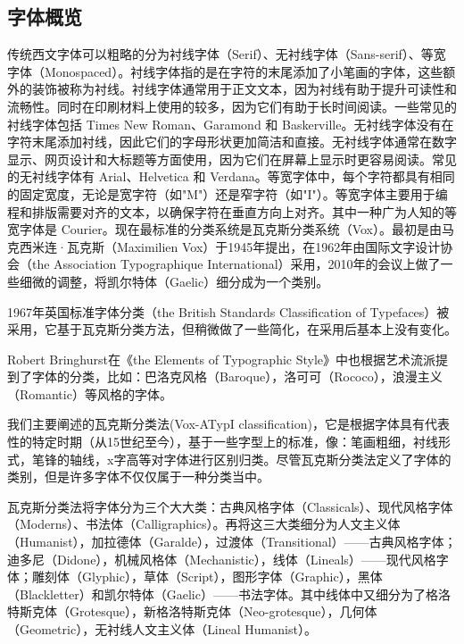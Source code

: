 \documentclass[../../../dolphin-book-2023.tex]{subfiles}
\begin{document}
\subsection{字体概览}

传统西文字体可以粗略的分为衬线字体（Serif）、无衬线字体（Sans-serif）、等宽字体（Monospaced）。衬线字体指的是在字符的末尾添加了小笔画的字体，这些额外的装饰被称为衬线。衬线字体通常用于正文文本，因为衬线有助于提升可读性和流畅性。同时在印刷材料上使用的较多，因为它们有助于长时间阅读。一些常见的衬线字体包括 Times New Roman、Garamond 和 Baskerville。无衬线字体没有在字符末尾添加衬线，因此它们的字母形状更加简洁和直接。无衬线字体通常在数字显示、网页设计和大标题等方面使用，因为它们在屏幕上显示时更容易阅读。常见的无衬线字体有 Arial、Helvetica 和 Verdana。等宽字体中，每个字符都具有相同的固定宽度，无论是宽字符（如"M"）还是窄字符（如"I"）。等宽字体主要用于编程和排版需要对齐的文本，以确保字符在垂直方向上对齐。其中一种广为人知的等宽字体是 Courier。现在最标准的分类系统是瓦克斯分类系统（Vox）。最初是由马克西米连·瓦克斯（Maximilien Vox）于1945年提出，在1962年由国际文字设计协会（the Association Typographique International）采用，2010年的会议上做了一些细微的调整，将凯尔特体（Gaelic）细分成为一个类别。

1967年英国标准字体分类（the British Standards Classification of Typefaces）被采用，它基于瓦克斯分类方法，但稍微做了一些简化，在采用后基本上没有变化。

Robert Bringhurst在《the Elements of Typographic Style》中也根据艺术流派提到了字体的分类，比如：巴洛克风格（Baroque），洛可可（Rococo），浪漫主义（Romantic）等风格的字体。

我们主要阐述的瓦克斯分类法(Vox-ATypI classification)，它是根据字体具有代表性的特定时期（从15世纪至今），基于一些字型上的标准，像：笔画粗细，衬线形式，笔锋的轴线，x字高等对字体进行区别归类。尽管瓦克斯分类法定义了字体的类别，但是许多字体不仅仅属于一种分类当中。

瓦克斯分类法将字体分为三个大大类：古典风格字体（Classicals）、现代风格字体（Moderns）、书法体（Calligraphics）。再将这三大类细分为人文主义体（Humanist），加拉德体（Garalde），过渡体（Transitional）——古典风格字体；迪多尼（Didone），机械风格体（Mechanistic），线体（Lineals）——现代风格字体；雕刻体（Glyphic），草体（Script），图形字体（Graphic），黑体（Blackletter）和凯尔特体（Gaelic）——书法字体。其中线体中又细分为了格洛特斯克体（Grotesque），新格洛特斯克体（Neo-grotesque），几何体（Geometric），无衬线人文主义体（Lineal Humanist）。
\end{document}
